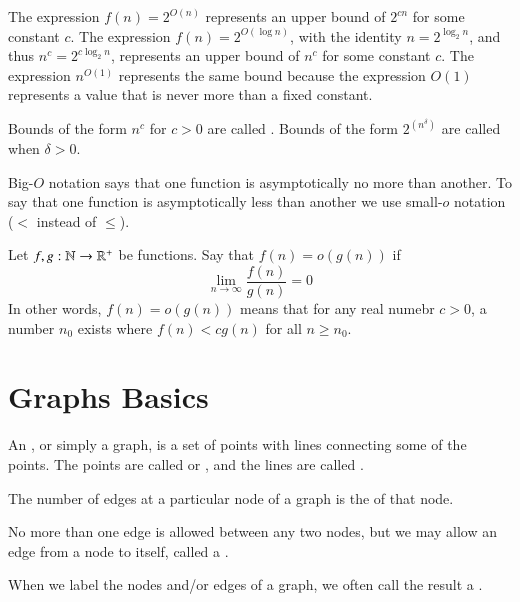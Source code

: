 \documentclass[12pt, a4paper, oneside, openright, titlepage]{book}
\begin{document}
\begin{appendices}
        The expression $f(n) = 2^{O(n)}$ represents an upper bound of $2^{cn}$ for some constant $c$. The expression $f(n) = 2^{O(\log n)}$, with the identity $n = 2^{\log_2n}$, and thus $n^c = 2^{c\log_2n}$, represents an upper bound of $n^c$ for some constant $c$. The expression $n^{O(1)}$ represents the same bound because the expression $O(1)$ represents a value that is never more than a fixed constant.

        Bounds of the form $n^c$ for $c > 0$ are called . Bounds of the form $2^{(n^{\delta})}$ are called  when $\delta > 0$.


        Big-$O$ notation says that one function is asymptotically no more than another. To say that one function is asymptotically less than another we use small-$o$ notation ($<$ instead of $\leq$).

        \begin{defn}
            Let $f,g:\mathbb N\rightarrow \mathbb R^+$ be functions. Say that $f(n) = o(g(n))$ if \begin{equation*}
                \lim\limits_{n\rightarrow \infty}\frac{f(n)}{g(n)} = 0
            \end{equation*}
            In other words, $f(n) = o(g(n))$ means that for any real numebr $c > 0$, a number $n_0$ exists where $f(n) < cg(n)$ for all $n \geq n_0$.
        \end{defn}



        \section{Graphs Basics}

        \begin{defn}
            An , or simply a graph, is a set of points with lines connecting some of the points. The points are called  or , and the lines are called .
        \end{defn}


        \begin{defn}
            The number of edges at a particular node of a graph is the  of that node.
        \end{defn}

        No more than one edge is allowed between any two nodes, but we may allow an edge from a node to itself, called a .

        When we label the nodes and/or edges of a graph, we often call the result a . 


\end{appendices}
\end{document}
